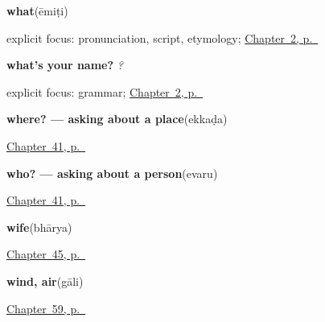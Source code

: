 \noindent\begin{minipage}[t]{\linewidth}
\raggedright
\textbf{what}\enspace\emph{}\enspace(ēmiṭi)\par
\footnotesize explicit focus: pronunciation, script, etymology; \hyperref[ch:introductions]{Chapter~2, p.~\pageref*{ch:introductions}}
\end{minipage}\par\smallskip

\noindent\begin{minipage}[t]{\linewidth}
\raggedright
\textbf{what's your name?}\enspace\emph{  ?}\par
\footnotesize explicit focus: grammar; \hyperref[ch:introductions]{Chapter~2, p.~\pageref*{ch:introductions}}
\end{minipage}\par\smallskip

\noindent\begin{minipage}[t]{\linewidth}
\raggedright
\textbf{where? — asking about a place}\enspace\emph{}\enspace(ekkaḍa)\par
\footnotesize \hyperref[ch:te-pointing-and-asking]{Chapter~41, p.~\pageref*{ch:te-pointing-and-asking}}
\end{minipage}\par\smallskip

\noindent\begin{minipage}[t]{\linewidth}
\raggedright
\textbf{who? — asking about a person}\enspace\emph{}\enspace(evaru)\par
\footnotesize \hyperref[ch:te-pointing-and-asking]{Chapter~41, p.~\pageref*{ch:te-pointing-and-asking}}
\end{minipage}\par\smallskip

\noindent\begin{minipage}[t]{\linewidth}
\raggedright
\textbf{wife}\enspace\emph{}\enspace(bhārya)\par
\footnotesize \hyperref[ch:te-grandparents]{Chapter~45, p.~\pageref*{ch:te-grandparents}}
\end{minipage}\par\smallskip

\noindent\begin{minipage}[t]{\linewidth}
\raggedright
\textbf{wind, air}\enspace\emph{}\enspace(gāli)\par
\footnotesize \hyperref[ch:te-weather-ground]{Chapter~59, p.~\pageref*{ch:te-weather-ground}}
\end{minipage}\par\smallskip

